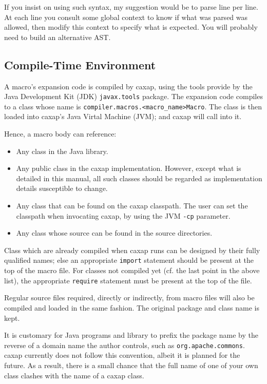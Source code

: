 If you insist on using such syntax, my suggestion would be to parse line per
line. At each line you consult some global context to know if what was parsed
was allowed, then modify this context to specify what is expected. You will
probably need to build an alternative AST.

\subsection{Compile-Time Environment}

A macro's expansion code is compiled by caxap, using the tools provide by the
Java Development Kit (JDK) \texttt{javax.tools} package. The expansion code
compiles to a class whose name is
\texttt{compiler.macros.<macro_name>Macro}. The class is then loaded into
caxap's Java Virtal Machine (JVM); and caxap will call into it.

Hence, a macro body can reference:

\begin{itemize}
\item Any class in the Java library.
\item Any public class in the caxap implementation. However, except what is
  detailed in this manual, all such classes should be regarded as implementation
  details susceptible to change.
\item Any class that can be found on the caxap classpath. The user can set the
  classpath when invocating caxap, by using the JVM \texttt{-cp} parameter.
\item Any class whose source can be found in the source directories.
\end{itemize}

Class which are already compiled when caxap runs can be designed by their fully
qualified names; else an appropriate \texttt{import} statement should be present
at the top of the macro file. For classes not compiled yet (cf. the last point
in the above list), the appropriate \texttt{require} statement must be present
at the top of the file.

Regular source files required, directly or indirectly, from macro files will
also be compiled and loaded in the same fashion. The original package and class
name is kept.

It is customary for Java programs and library to prefix the package name by the
reverse of a domain name the author controls, such as
\texttt{org.apache.commons}. caxap currently does not follow this convention,
albeit it is planned for the future. As a result, there is a small chance that
the full name of one of your own class clashes with the name of a caxap class.

